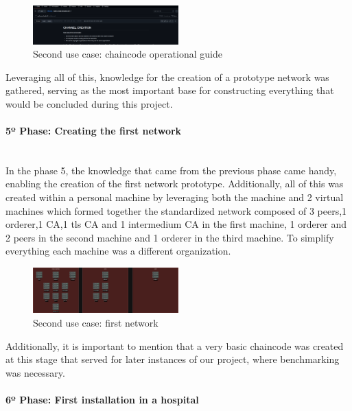 \begin{figure}[H]
    \centering
    \includegraphics[width=0.5\textwidth]{assets/use-case-2/notes-channel-and-chaincode.png} %
    \caption{Second use case: chaincode operational guide}
    \label{fig:sample-image} 
\end{figure}

Leveraging all of this, knowledge for the creation of a prototype network was gathered, serving as the most important base for constructing everything that would be concluded during this project.

\paragraph{5º Phase: Creating the first network}\mbox{}\\

In the phase 5, the knowledge that came from the previous phase came handy, enabling the creation of the first network prototype. Additionally, all of this was created within a personal machine by leveraging both the machine and 2 virtual machines which formed together the standardized network composed of 3 peers,1 orderer,1 CA,1 tls CA and 1 intermedium CA in the first machine, 1 orderer and 2 peers in the second machine and 1 orderer in the third machine. To simplify everything each machine was a different organization.

\begin{figure}[H]
    \centering
    \includegraphics[width=0.5\textwidth]{assets/use-case-2/default-first-netwrk.drawio.png} %
    \caption{Second use case: first network}
    \label{fig:sample-image} 
\end{figure}

Additionally, it is important to mention that a very basic chaincode was created at this stage that served for later instances of our project, where benchmarking was necessary.

\paragraph{6º Phase: First installation in a hospital}\mbox{}\\

